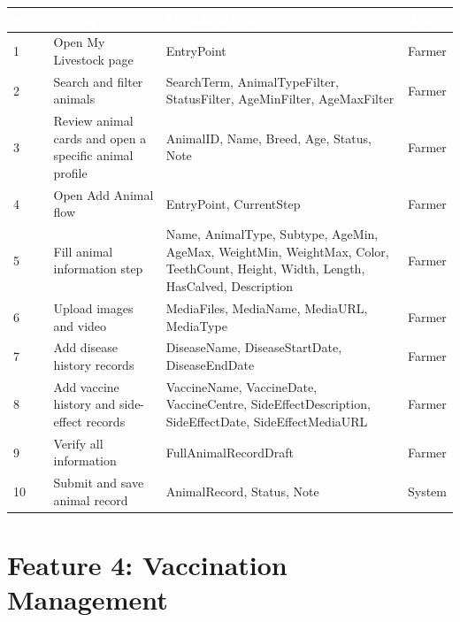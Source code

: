 \documentclass[12pt]{article}
\begin{document}
\begin{longtable}{|p{1.2cm}|p{5.6cm}|p{5.7cm}|p{2cm}|}
\hline
\rowcolor{headerblue}\textcolor{white}{\textbf{Step}} & \textcolor{white}{\textbf{Action}} & \textcolor{white}{\textbf{Metadata Used}} & \textcolor{white}{\textbf{Actor}} \\
\hline
1 & Open My Livestock page & EntryPoint & Farmer \\
\hline
\rowcolor{rowgray}
2 & Search and filter animals & SearchTerm, AnimalTypeFilter, StatusFilter, AgeMinFilter, AgeMaxFilter & Farmer \\
\hline
3 & Review animal cards and open a specific animal profile & AnimalID, Name, Breed, Age, Status, Note & Farmer \\
\hline
\rowcolor{rowgray}
4 & Open Add Animal flow & EntryPoint, CurrentStep & Farmer \\
\hline
5 & Fill animal information step & Name, AnimalType, Subtype, AgeMin, AgeMax, WeightMin, WeightMax, Color, TeethCount, Height, Width, Length, HasCalved, Description & Farmer \\
\hline
\rowcolor{rowgray}
6 & Upload images and video & MediaFiles, MediaName, MediaURL, MediaType & Farmer \\
\hline
7 & Add disease history records & DiseaseName, DiseaseStartDate, DiseaseEndDate & Farmer \\
\hline
\rowcolor{rowgray}
8 & Add vaccine history and side-effect records & VaccineName, VaccineDate, VaccineCentre, SideEffectDescription, SideEffectDate, SideEffectMediaURL & Farmer \\
\hline
9 & Verify all information & FullAnimalRecordDraft & Farmer \\
\hline
\rowcolor{rowgray}
10 & Submit and save animal record & AnimalRecord, Status, Note & System \\
\hline
\end{longtable}

\newpage
\section{Feature 4: Vaccination Management}
\end{document}
